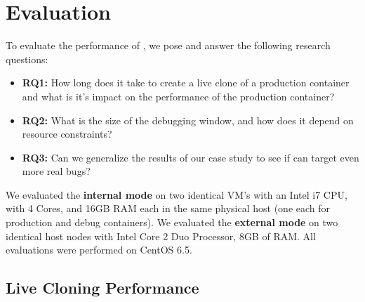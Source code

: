 \section{Evaluation}
\label{sec:parikshanEvaluation}

To evaluate the performance of \parikshan, we pose and answer the following research questions:

\begin{itemize}
\item \textbf{RQ1:} How long does it take to create a live clone of a production container and what is it's impact on the performance of the production container?\\
\item \textbf{RQ2:} What is the size of the debugging window, and how does it depend on resource constraints?\\ 
\item \textbf{RQ3:} Can we generalize the results of our case study to see if \parikshan can target even more real bugs?
\end{itemize}

We evaluated the \textbf{internal mode} on two identical VM's with an Intel i7 CPU, with 4 Cores, and 16GB RAM each in the same physical host (one each for production and debug containers).
We evaluated the \textbf{external mode} on two identical host nodes with Intel Core 2 Duo Processor, 8GB of RAM.
All evaluations were performed on CentOS 6.5.


\subsection{Live Cloning Performance}
\label{sec:parikshanPerformance}

